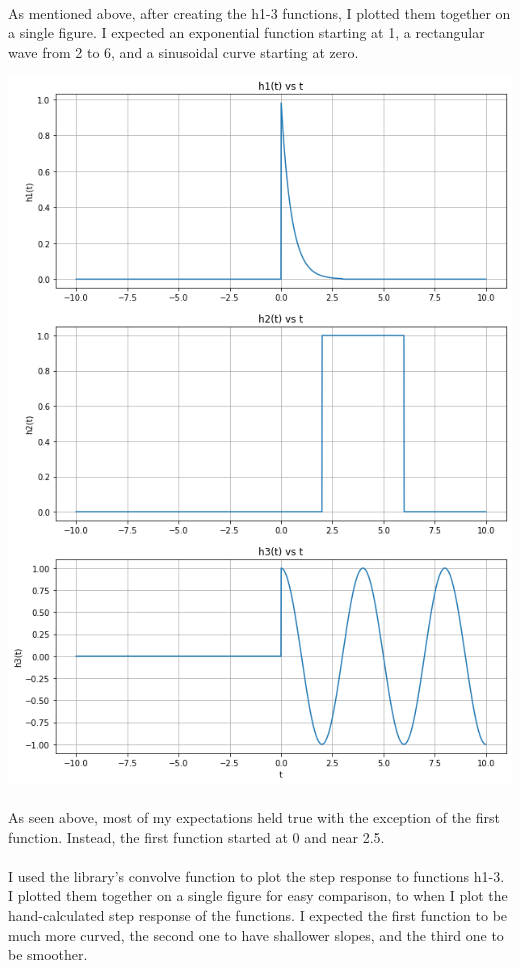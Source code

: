 \documentclass[12pt]{report}
\begin{document}
    \paragraph{} As mentioned above, after creating the h1-3 functions, I plotted them together on a single figure. I expected an exponential function starting at 1, a rectangular wave from 2 to 6, and a sinusoidal curve starting at zero.

    \includegraphics[scale=0.6]{functs h1-3.png}

    \paragraph{} As seen above, most of my expectations held true with the exception of the first function. Instead, the first function started at 0 and near 2.5.    
    
    \paragraph{} I used the library's convolve function to plot the step response to functions h1-3. I plotted them together on a single figure for easy comparison, to when I plot the hand-calculated step response of the functions. I expected the first function to be much more curved, the second one to have shallower slopes, and the third one to be smoother. 
    
\end{document}
